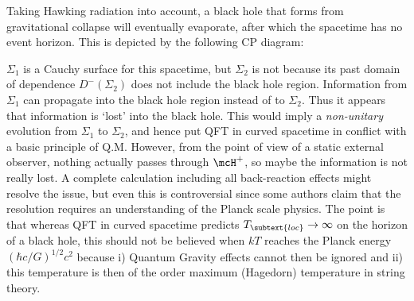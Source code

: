 Taking Hawking radiation into account, a black hole that forms from 
gravitational collapse will eventually evaporate, after which the spacetime has
no event horizon.  This is depicted by the following CP diagram:
\begin{center}\end{center}
$\Sigma_1$ is a Cauchy surface for this spacetime, but $\Sigma_2$ is not 
because its past domain of dependence $D^-\left(\Sigma_2\right)$ does not
include the black hole region.  Information from $\Sigma_1$ can propagate into
the black hole region instead of to $\Sigma_2$.  Thus it appears that
information is `lost' into the black hole.  This would imply a
\emph{non-unitary} evolution from $\Sigma_1$ to $\Sigma_2$, and hence put QFT in
curved spacetime in conflict with a basic principle of Q.M.  However, from the
point of view of a static external observer, nothing actually passes through
$\mcH^+$, so maybe the information is not really lost.  A complete calculation
including all back-reaction effects might resolve the issue, but even this is
controversial since some authors claim that the resolution requires an
understanding of the Planck scale physics.  The point is that whereas QFT in
curved spacetime predicts $T_{\subtext{loc}}\to\infty$ on the horizon of a black
hole, this should not be believed when $kT$ reaches the Planck energy
$\left(\hbar c/G\right)^{1/2}c^2$ because i) Quantum Gravity effects cannot then be ignored and ii) this temperature is then of the order
maximum (Hagedorn) temperature in string theory. \\


